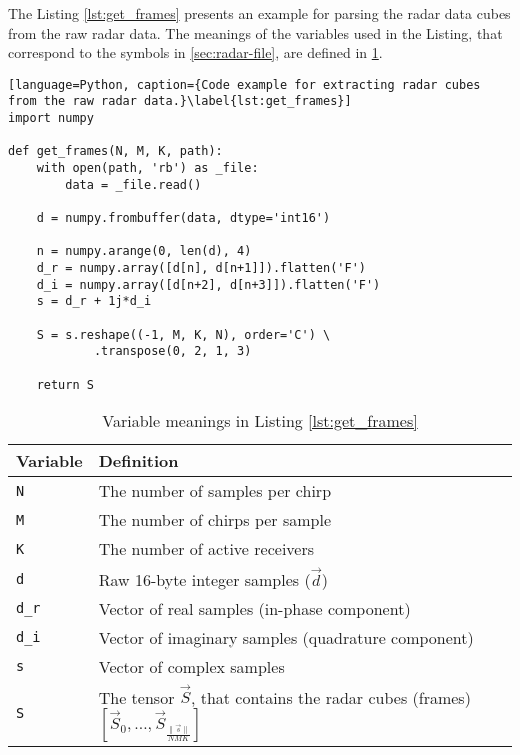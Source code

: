 The Listing \ref{lst:get_frames} presents an example for parsing the radar data cubes from the raw radar data.
The meanings of the variables used in the Listing,
that correspond to the symbols in \ref{sec:radar-file},
are defined in \ref{tab:get_frames_variable_definitions}.

\begin{lstlisting}[language=Python, caption={Code example for extracting radar cubes from the raw radar data.}\label{lst:get_frames}]
import numpy

def get_frames(N, M, K, path):
    with open(path, 'rb') as _file:
        data = _file.read()
        
    d = numpy.frombuffer(data, dtype='int16')

    n = numpy.arange(0, len(d), 4)
    d_r = numpy.array([d[n], d[n+1]]).flatten('F')
    d_i = numpy.array([d[n+2], d[n+3]]).flatten('F')
    s = d_r + 1j*d_i
    
    S = s.reshape((-1, M, K, N), order='C') \
            .transpose(0, 2, 1, 3)

    return S
\end{lstlisting}

\begin{table}[]
    \centering
    \begin{tabular}{l l}
        \toprule
            \textbf{Variable} & \textbf{Definition} \\
        \midrule
            \texttt{N} & The number of samples per chirp \\
            \texttt{M} & The number of chirps per sample \\
            \texttt{K} & The number of active receivers \\
            \texttt{d} & Raw 16-byte integer samples ($\vec{d}$) \\
            \texttt{d\_r} & Vector of real samples (in-phase component) \\
            \texttt{d\_i} & Vector of imaginary samples (quadrature component) \\
            \texttt{s} & Vector of complex samples \\
            \texttt{S} & The tensor $\vec{S}$, that contains the radar cubes (frames) $\left[ \vec{S}_0, \ldots, \vec{S}_{ \frac{\|\vec{s}\|}{NMK}} \right]$ \\
        \bottomrule
    \end{tabular}
    \caption{Variable meanings in Listing \ref{lst:get_frames}}
    \label{tab:get_frames_variable_definitions}
\end{table}